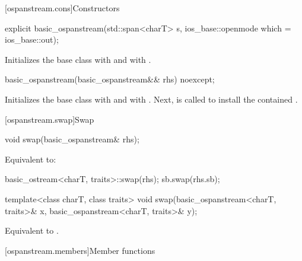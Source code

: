 [ospanstream.cons]{Constructors}

%
\begin{itemdecl}
explicit basic_ospanstream(std::span<charT> s,
                           ios_base::openmode which = ios_base::out);
\end{itemdecl}

\begin{itemdescr}
\pnum
\effects
Initializes the base class with
and  with
.
\end{itemdescr}

%
\begin{itemdecl}
basic_ospanstream(basic_ospanstream&& rhs) noexcept;
\end{itemdecl}

\begin{itemdescr}
\pnum
\effects
Initializes the base class with 
and  with .
Next, 
is called to install the contained .
\end{itemdescr}

[ospanstream.swap]{Swap}

%
\begin{itemdecl}
void swap(basic_ospanstream& rhs);
\end{itemdecl}

\begin{itemdescr}
\pnum
\effects
Equivalent to:
\begin{codeblock}
basic_ostream<charT, traits>::swap(rhs);
sb.swap(rhs.sb);
\end{codeblock}
\end{itemdescr}

%
\begin{itemdecl}
template<class charT, class traits>
  void swap(basic_ospanstream<charT, traits>& x, basic_ospanstream<charT, traits>& y);
\end{itemdecl}

\begin{itemdescr}
\pnum
\effects
Equivalent to .
\end{itemdescr}

[ospanstream.members]{Member functions}

